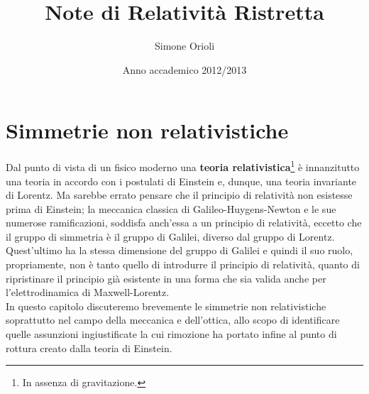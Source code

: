 \documentclass[a4paper,11pt]{book}
\theoremstyle{plain}
\theoremstyle{definition}
\begin{document}
 

\title{Note di Relatività Ristretta} 
\author{Simone Orioli} 
\date{Anno accademico 2012/2013} 
\maketitle 
\pagestyle{fancy}

\tableofcontents

\chapter{Simmetrie non relativistiche}
Dal punto di vista di un fisico moderno una \textbf{teoria relativistica}\footnote{In assenza di gravitazione.} è innanzitutto una teoria 
in accordo con i postulati di Einstein e, dunque, una teoria invariante di Lorentz. Ma 
sarebbe errato pensare che il principio di relatività non esistesse prima di Einstein; la 
meccanica classica di Galileo-Huygens-Newton e le sue numerose ramificazioni, soddisfa 
anch'essa a un principio di relatività, eccetto che il gruppo di simmetria è il gruppo di 
Galilei, diverso dal gruppo di Lorentz. Quest'ultimo ha la stessa dimensione del gruppo 
di Galilei e quindi il suo ruolo, propriamente, non è tanto quello di introdurre il principio 
di relatività, quanto di ripristinare il principio già esistente in una forma che sia valida 
anche per l'elettrodinamica di Maxwell-Lorentz. \\
In questo capitolo discuteremo brevemente le simmetrie non relativistiche soprattutto 
nel campo della meccanica e dell'ottica, allo scopo di identificare quelle assunzioni ingiustificate la cui rimozione ha portato infine al punto di rottura creato dalla teoria di Einstein. 
 
\end{document}
